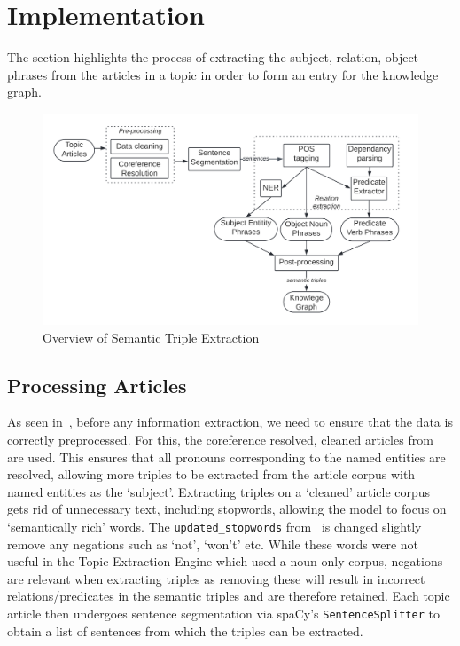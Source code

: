 \section{Implementation}

The section highlights the process of extracting the subject, relation, object phrases from the articles in a topic in order to form an entry for the knowledge graph. 

\begin{figure}[H]
  \centering
  \includegraphics[scale=0.17]{images/ste_imp.png}
  \vspace{-2ex}
  \caption{Overview of Semantic Triple Extraction}
  \label{fig:rel_overview}
\end{figure}

\subsection{Processing Articles}
As seen in~, before any information extraction, we need to ensure that the data is correctly preprocessed. For this, the coreference resolved, cleaned articles from~ are used. This ensures that all pronouns corresponding to the named entities are resolved, allowing more triples to be extracted from the article corpus with named entities as the `subject'. Extracting triples on a `cleaned' article corpus gets rid of unnecessary text, including stopwords, allowing the model to focus on `semantically rich' words. The \texttt{updated\_stopwords} from~ is changed slightly remove any negations such as `not', `won't' etc. While these words were not useful in the Topic Extraction Engine which used a noun-only corpus, negations are relevant when extracting triples as removing these will result in incorrect relations/predicates in the semantic triples and are therefore retained. Each topic article then undergoes sentence segmentation via spaCy's \texttt{SentenceSplitter} to obtain a list of sentences from which the triples can be extracted.

